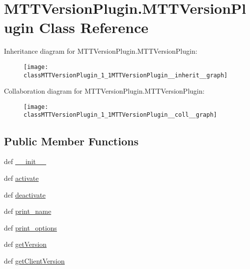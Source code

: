 \hypertarget{classMTTVersionPlugin_1_1MTTVersionPlugin}{\section{M\-T\-T\-Version\-Plugin.\-M\-T\-T\-Version\-Plugin Class Reference}
\label{classMTTVersionPlugin_1_1MTTVersionPlugin}
}


Inheritance diagram for M\-T\-T\-Version\-Plugin.\-M\-T\-T\-Version\-Plugin\-:\nopagebreak
\begin{figure}[H]
\begin{center}
\leavevmode
\texttt{[image: classMTTVersionPlugin\_1\_1MTTVersionPlugin\_\_inherit\_\_graph]}
\end{center}
\end{figure}


Collaboration diagram for M\-T\-T\-Version\-Plugin.\-M\-T\-T\-Version\-Plugin\-:\nopagebreak
\begin{figure}[H]
\begin{center}
\leavevmode
\texttt{[image: classMTTVersionPlugin\_1\_1MTTVersionPlugin\_\_coll\_\_graph]}
\end{center}
\end{figure}
\subsection*{Public Member Functions}
\begin{DoxyCompactItemize}
\item 
def \hyperlink{classMTTVersionPlugin_1_1MTTVersionPlugin_ac0154c5878b4d9428f25bd81041a7001}{\-\_\-\-\_\-init\-\_\-\-\_\-}
\item 
def \hyperlink{classMTTVersionPlugin_1_1MTTVersionPlugin_a226b355e9ac12c9ff72acdb0caed743f}{activate}
\item 
def \hyperlink{classMTTVersionPlugin_1_1MTTVersionPlugin_a8b2f6a214a6b2aa86edb153ef202cae2}{deactivate}
\item 
def \hyperlink{classMTTVersionPlugin_1_1MTTVersionPlugin_a99e7df2f04fea79f772d940de9bb734e}{print\-\_\-name}
\item 
def \hyperlink{classMTTVersionPlugin_1_1MTTVersionPlugin_af46b74be44c27d532b1d542c8fafef8e}{print\-\_\-options}
\item 
def \hyperlink{classMTTVersionPlugin_1_1MTTVersionPlugin_ad1be874bcc65f8cf6262403e414ce8e8}{get\-Version}
\item 
def \hyperlink{classMTTVersionPlugin_1_1MTTVersionPlugin_a8352904d6605d8c47b3c98b92a304ec7}{get\-Client\-Version}
\end{DoxyCompactItemize}
